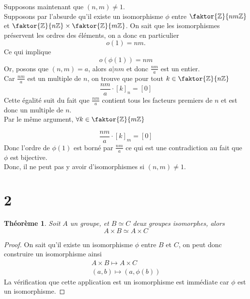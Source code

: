 \documentclass[11pt, a4paper, twoside]{article}
\newtheorem{thm}{Théorème}
\newcommand{\f}{\faktor}
\begin{document}
Supposons maintenant que $( n,m) \neq1$.\\
Supposons par l'absurde qu'il existe un isomorphisme $\phi$ entre $\f { \mathbb{Z}} { nm \mathbb{Z}} $ et $\f { \mathbb{Z}} { n\mathbb{Z}} \times\f { \mathbb{Z}} { m \mathbb{Z}} $.
On sait que les isomorphismes préservent les ordres des éléments, on a donc en particulier
\[ 
	o( 1) = nm.
\]
Ce qui implique
\[ 
	o(\phi( 1)) = nm
\]
Or, posons que $( n,m) = a$,  alors $a|nm$ et donc $\frac{nm}{a}$ est un entier.\\
Car $\frac{nm}{a}$ est un multiple de $n$, on trouve que pour tout $k \in \f { \mathbb{Z}} { n\mathbb{Z}}$ 
\[ 
\frac{nm}{a} \cdot [ k ]_n = [ 0 ]
\]
Cette égalité suit du fait que $\frac{nm}{a}$ contient tous les facteurs premiers de $n$ et est donc un multiple de $n$.\\
Par le même argument, $\forall k \in\f { \mathbb{Z}} { m\mathbb{Z}} $

\[ 
\frac{nm}{a} \cdot [ k ]_m = [ 0 ]
\]
Donc l'ordre de $ \phi( 1) $ est borné par $\frac{nm}{a}$ ce qui est une contradiction au fait que $\phi$ est bijective.\\
Donc, il ne peut pas y avoir d'isomorphismes si $( n,m) \neq 1$.
\section*{2}
\begin{thm}
Soit $A$ un groupe, et $B\simeq C$ deux groupes isomorphes, alors
\[ 
A \times B \simeq A \times C
\]
\end{thm}
\begin{proof}
	On sait qu'il existe un isomorphisme $\phi$ entre $B$ et $C$, on peut donc construire un isomorphisme ainsi
	\begin{align*}
	A \times B \mapsto A \times C\\
	(a,b) \mapsto ( a, \phi( b) ) 
	\end{align*}
La vérification que cette application est un isomorphisme est immédiate car $\phi$ est un isomorphisme.
\end{proof}
	
\end{document}
